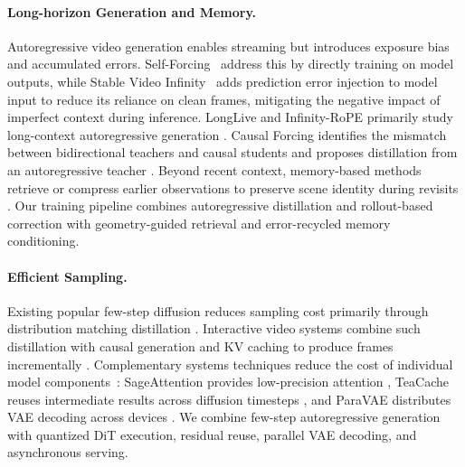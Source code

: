 \documentclass{llmxive}
\begin{document}
\paragraph{\bf{Long-horizon Generation and Memory.}}
Autoregressive video generation enables streaming but introduces exposure bias
and accumulated errors. Self-Forcing~\citep{huang2025selfforcing} address this by directly training on model outputs, while Stable Video Infinity~\citep{li2025stablevideoinfinity} adds prediction error injection to model input to reduce its reliance on clean frames, mitigating the negative impact of imperfect context during inference. LongLive and Infinity-RoPE primarily study long-context autoregressive generation
\citep{yang2025longlive,yesiltepe2025infinityrope}. Causal Forcing identifies
the mismatch between bidirectional teachers and causal students and proposes distillation from an autoregressive teacher
\citep{zhu2026causalforcing,zhao2026causalforcingplusplus}.
Beyond recent context, memory-based methods retrieve or compress earlier
observations to preserve scene identity during revisits
\citep{yu2025contextmemory,sun2025worldplay,hong2025relic,
yu2026mosaicmem,wang2026matrixgame}. Our training pipeline combines
autoregressive distillation and rollout-based correction with geometry-guided
retrieval and error-recycled memory conditioning.

\paragraph{\bf{Efficient Sampling.}}
Existing popular few-step diffusion reduces sampling cost primarily through distribution matching
distillation \citep{yin2024onestep,yin2024improved}. Interactive video systems
combine such distillation with causal generation and KV caching to produce
frames incrementally
\citep{huang2025selfforcing,yang2025longlive,zhu2026causalforcing}.
Complementary systems techniques reduce the cost of individual model
components~\citep{zhang2025sageattention, wang2026fasa, liu2025teacache, riseai2026paravae}: SageAttention provides low-precision attention
\citep{zhang2025sageattention}, TeaCache reuses intermediate results across
diffusion timesteps \citep{liu2025teacache}, and ParaVAE distributes VAE
decoding across devices \citep{riseai2026paravae}. We combine few-step
autoregressive generation with quantized DiT execution, residual reuse,
parallel VAE decoding, and asynchronous serving.
\end{document}
